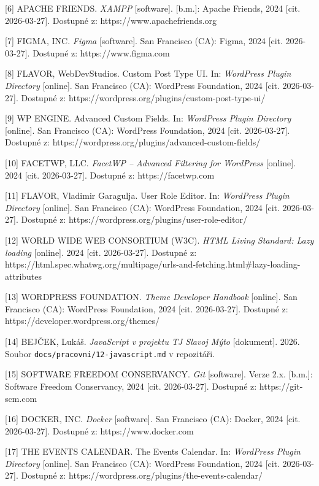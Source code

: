 {[}6{]} APACHE FRIENDS. \emph{XAMPP} {[}software{]}. {[}b.m.{]}: Apache
Friends, 2024 {[}cit. 2026-03-27{]}. Dostupné z:
https://www.apachefriends.org

{[}7{]} FIGMA, INC. \emph{Figma} {[}software{]}. San Francisco (CA):
Figma, 2024 {[}cit. 2026-03-27{]}. Dostupné z: https://www.figma.com

{[}8{]} FLAVOR, WebDevStudios. Custom Post Type UI. In: \emph{WordPress
Plugin Directory} {[}online{]}. San Francisco (CA): WordPress
Foundation, 2024 {[}cit. 2026-03-27{]}. Dostupné z:
https://wordpress.org/plugins/custom-post-type-ui/

{[}9{]} WP ENGINE. Advanced Custom Fields. In: \emph{WordPress Plugin
Directory} {[}online{]}. San Francisco (CA): WordPress Foundation, 2024
{[}cit. 2026-03-27{]}. Dostupné z:
https://wordpress.org/plugins/advanced-custom-fields/

{[}10{]} FACETWP, LLC. \emph{FacetWP -- Advanced Filtering for
WordPress} {[}online{]}. 2024 {[}cit. 2026-03-27{]}. Dostupné z:
https://facetwp.com

{[}11{]} FLAVOR, Vladimir Garagulja. User Role Editor. In:
\emph{WordPress Plugin Directory} {[}online{]}. San Francisco (CA):
WordPress Foundation, 2024 {[}cit. 2026-03-27{]}. Dostupné z:
https://wordpress.org/plugins/user-role-editor/

{[}12{]} WORLD WIDE WEB CONSORTIUM (W3C). \emph{HTML Living Standard:
Lazy loading} {[}online{]}. 2024 {[}cit. 2026-03-27{]}. Dostupné z:
https://html.spec.whatwg.org/multipage/urls-and-fetching.html\#lazy-loading-attributes

{[}13{]} WORDPRESS FOUNDATION. \emph{Theme Developer Handbook}
{[}online{]}. San Francisco (CA): WordPress Foundation, 2024 {[}cit.
2026-03-27{]}. Dostupné z: https://developer.wordpress.org/themes/

{[}14{]} BEJČEK, Lukáš. \emph{JavaScript v projektu TJ Slavoj Mýto}
{[}dokument{]}. 2026. Soubor \texttt{docs/pracovni/12-javascript.md} v
repozitáři.

{[}15{]} SOFTWARE FREEDOM CONSERVANCY. \emph{Git} {[}software{]}. Verze
2.x. {[}b.m.{]}: Software Freedom Conservancy, 2024 {[}cit.
2026-03-27{]}. Dostupné z: https://git-scm.com

{[}16{]} DOCKER, INC. \emph{Docker} {[}software{]}. San Francisco (CA):
Docker, 2024 {[}cit. 2026-03-27{]}. Dostupné z: https://www.docker.com

{[}17{]} THE EVENTS CALENDAR. The Events Calendar. In: \emph{WordPress
Plugin Directory} {[}online{]}. San Francisco (CA): WordPress
Foundation, 2024 {[}cit. 2026-03-27{]}. Dostupné z:
https://wordpress.org/plugins/the-events-calendar/

